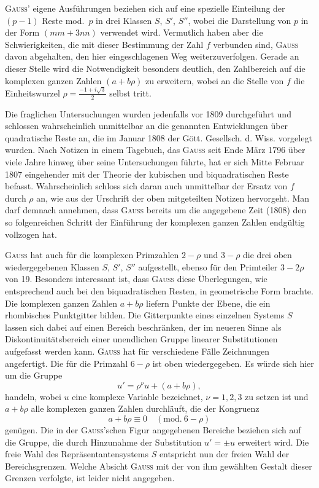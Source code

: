 \textsc{Gauss}' eigene Ausführungen beziehen sich auf eine spezielle Einteilung der
$(p-1)$ Reste mod.\ $p$ in drei Klassen $S$, $S'$, $S''$, wobei die
Darstellung von $p$ in der Form $(mm+3nn)$ verwendet wird. Vermutlich haben
aber die Schwierigkeiten, die mit dieser Bestimmung der Zahl $f$ verbunden
sind, \textsc{Gauss} davon abgehalten, den hier eingeschlagenen Weg weiterzuverfolgen.
Gerade an dieser Stelle wird die Notwendigkeit besonders deutlich, den
Zahlbereich auf die komplexen ganzen Zahlen $(a+b\rho)$ zu erweitern, wobei an
die Stelle von $f$ die Einheitswurzel
$\rho = \frac{-1+i\sqrt{3}}{2}$ selbst tritt.

Die fraglichen Untersuchungen wurden jedenfalls vor 1809 durchgeführt und
schlossen wahrscheinlich unmittelbar an die genannten Entwicklungen über
quadratische Reste an, die im Januar 1808 der Gött. Gesellsch. d. Wiss. vorgelegt
wurden. Nach Notizen in einem Tagebuch, das \textsc{Gauss} seit Ende März 1796
über viele Jahre hinweg über seine Untersuchungen führte, hat er sich Mitte Februar
1807 eingehender mit der Theorie der kubischen und biquadratischen Reste befasst.
Wahrscheinlich schloss sich daran auch unmittelbar der Ersatz von $f$ durch
$\rho$ an, wie aus der Urschrift der oben mitgeteilten Notizen hervorgeht. Man
darf demnach annehmen, dass \textsc{Gauss} bereits um die angegebene Zeit (1808) den
so folgenreichen Schritt der Einführung der komplexen ganzen Zahlen endgültig
vollzogen hat.

\textsc{Gauss} hat auch für die komplexen Primzahlen $2-\rho$ und $3-\rho$ die drei
oben wiedergegebenen Klassen $S$, $S'$, $S''$ aufgestellt, ebenso für den
Primteiler $3-2\rho$ von 19. Besonders interessant ist, dass \textsc{Gauss} diese Überlegungen,
wie entsprechend auch bei den biquadratischen Resten, in geometrische Form
brachte. Die komplexen ganzen Zahlen $a+b\rho$ liefern Punkte der Ebene, die ein
rhombisches Punktgitter bilden. Die Gitterpunkte eines einzelnen Systems
$S$ lassen sich dabei auf einen Bereich beschränken, der im neueren Sinne
als Diskontinuitätsbereich einer unendlichen Gruppe linearer Substitutionen
aufgefasst werden kann. \textsc{Gauss} hat für verschiedene Fälle Zeichnungen
angefertigt. Die für die Primzahl $6-\rho$ ist oben wiedergegeben. Es würde sich
hier um die Gruppe
\[
u' = \rho^{\nu} u + (a+b\rho),
\]
handeln, wobei $u$ eine komplexe Variable bezeichnet, $\nu = 1, 2, 3$ zu setzen ist
und $a+b\rho$ alle komplexen ganzen Zahlen durchläuft, die der Kongruenz
\[
a+b\rho \equiv 0 \quad(\mathrm{mod.}\ 6-\rho)
\]
genügen. Die in der \textsc{Gauss}'schen Figur angegebenen Bereiche beziehen sich
auf die Gruppe, die durch Hinzunahme der Substitution $u' = \pm u$ erweitert wird.
Die freie Wahl des Repräsentantensystems $S$ entspricht nun der freien Wahl
der Bereichsgrenzen. Welche Absicht \textsc{Gauss} mit der von ihm gewählten Gestalt
dieser Grenzen verfolgte, ist leider nicht angegeben.

